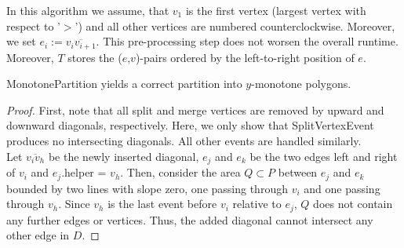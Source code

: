 \begin{breakablealgorithm}
\begin{algorithmic}[1]
                    \EndIf
                \EndProcedure
                        \EndIf
                    \Else
                        \EndIf
                    \EndIf
                \EndProcedure
            \end{algorithmic}
        \end{breakablealgorithm}

        \begin{remark}
            In this algorithm we assume, that $v_1$ is the first vertex (largest vertex with respect to  '$>$') and  all other vertices are numbered counterclockwise. Moreover, we set $e_i := \overline{v_iv_{i+1}}$. This pre-processing step does not worsen the overall runtime. Moreover, $T$ stores the ($e$,$v$)-pairs ordered by the left-to-right position of $e$.
        \end{remark}

        \begin{proposition}
            MonotonePartition yields a correct partition into $y$-monotone polygons.
        \end{proposition}
        \begin{proof} 
            First, note that all split and merge vertices are removed by upward and downward diagonals, respectively. Here, we only show that SplitVertexEvent produces no intersecting diagonals. All other events are handled similarly. \\
            Let $\overline{v_iv_h}$ be the newly inserted diagonal, $e_j$ and $e_k$ be the two edges left and right of $v_i$ and $e_j$.helper = $v_h$. Then, consider the area $Q \subset P$ between $e_j$ and $e_k$ bounded by two lines with slope zero, one passing through $v_i$ and one passing through $v_h$. Since $v_h$ is the last event before $v_i$ relative to $e_j$, $Q$ does not contain any further edges or vertices. Thus, the added diagonal cannot intersect any other edge in $D$.
        \end{proof}

